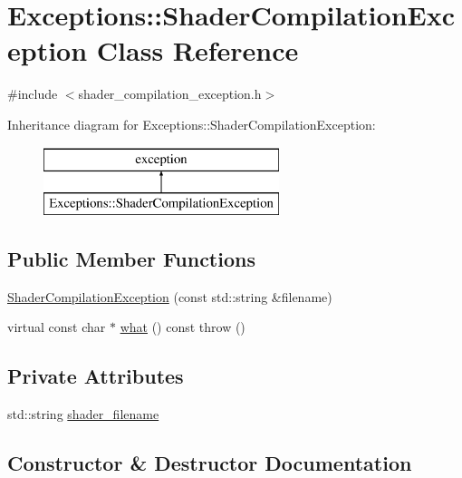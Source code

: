 \hypertarget{class_exceptions_1_1_shader_compilation_exception}{}\section{Exceptions\+:\+:Shader\+Compilation\+Exception Class Reference}
\label{class_exceptions_1_1_shader_compilation_exception}


{\ttfamily \#include $<$shader\+\_\+compilation\+\_\+exception.\+h$>$}

Inheritance diagram for Exceptions\+:\+:Shader\+Compilation\+Exception\+:\begin{figure}[H]
\begin{center}
\leavevmode
\includegraphics[height=2.000000cm]{class_exceptions_1_1_shader_compilation_exception}
\end{center}
\end{figure}
\subsection*{Public Member Functions}
\begin{DoxyCompactItemize}
\item 
\hyperlink{class_exceptions_1_1_shader_compilation_exception_a54bfc3c68f7c4aa388fbf73551cda495}{Shader\+Compilation\+Exception} (const std\+::string \&filename)
\item 
virtual const char $\ast$ \hyperlink{class_exceptions_1_1_shader_compilation_exception_ae5d257d5aea5325d820ec841747abe07}{what} () const   throw ()
\end{DoxyCompactItemize}
\subsection*{Private Attributes}
\begin{DoxyCompactItemize}
\item 
std\+::string \hyperlink{class_exceptions_1_1_shader_compilation_exception_a9762b7c686cc137596a40ad16d19a2f9}{shader\+\_\+filename}
\end{DoxyCompactItemize}


\subsection{Constructor \& Destructor Documentation}
\hypertarget{class_exceptions_1_1_shader_compilation_exception_a54bfc3c68f7c4aa388fbf73551cda495}{}
